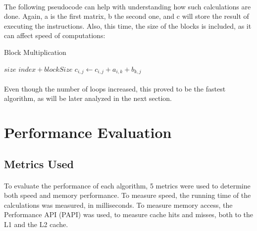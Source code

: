 \documentclass{report}
\begin{document}
    \paragraph{}The following pseudocode can help with understanding how such calculations are done. Again, a is the first matrix, b the second one, and c will store the result of executing the instructions. Also, this time, the size of the blocks is included, as it can affect speed of computations:

    \begin{algorithm}
      \caption{Block Multiplication}\label{euclid}
      \begin{algorithmic}[1]
        \State \Return $size$
        \Else
        \State \Return $index + blockSize$
        \EndIf
        \EndProcedure
        \State $c_{i, j} \leftarrow c_{i, j} + a_{i, k} + b_{k, j}$
        \EndFor
        \EndFor
        \EndFor
        \EndFor
        \EndFor
        \EndProcedure
      \end{algorithmic}
    \end{algorithm}

    \paragraph{}Even though the number of loops increased, this proved to be the fastest algorithm, as will be later analyzed in the next section.

    \section*{Performance Evaluation}

    \subsection*{Metrics Used}

    \paragraph{}To evaluate the performance of each algorithm, 5 metrics were used to determine both speed and memory performance. To measure speed, the running time of the calculations was measured, in milliseconds. To measure memory access, the Performance API (PAPI) was used, to measure cache hits and misses, both to the L1 and the L2 cache.
\end{document}
